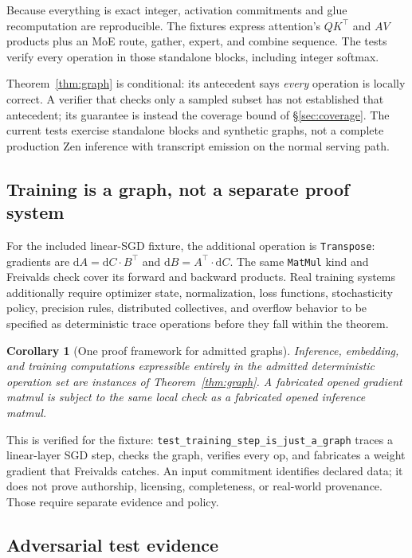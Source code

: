\documentclass[11pt,a4paper]{article}
\newtheorem{corollary}{Corollary}
\begin{document}
Because everything is exact integer, activation commitments and glue recomputation are reproducible. The fixtures express attention's $QK^{\top}$ and $AV$ products plus an MoE route, gather, expert, and combine sequence. The tests verify every operation in those standalone blocks, including integer softmax.

Theorem~\ref{thm:graph} is conditional: its antecedent says \emph{every} operation is locally correct. A verifier that checks only a sampled subset has not established that antecedent; its guarantee is instead the coverage bound of \S\ref{sec:coverage}. The current tests exercise standalone blocks and synthetic graphs, not a complete production Zen inference with transcript emission on the normal serving path.

\subsection{Training is a graph, not a separate proof system}\label{sec:training}

For the included linear-SGD fixture, the additional operation is \texttt{Transpose}: gradients are $\mathrm{d}A = \mathrm{d}C \cdot B^{\top}$ and $\mathrm{d}B = A^{\top} \cdot \mathrm{d}C$. The same \texttt{MatMul} kind and Freivalds check cover its forward and backward products. Real training systems additionally require optimizer state, normalization, loss functions, stochasticity policy, precision rules, distributed collectives, and overflow behavior to be specified as deterministic trace operations before they fall within the theorem.

\begin{corollary}[One proof framework for admitted graphs]\label{cor:one-system}
Inference, embedding, and training computations expressible entirely in the admitted deterministic operation set are instances of Theorem~\ref{thm:graph}. A fabricated opened gradient matmul is subject to the same local check as a fabricated opened inference matmul.
\end{corollary}

This is verified for the fixture: \texttt{test\_training\_step\_is\_just\_a\_graph} traces a linear-layer SGD step, checks the graph, verifies every op, and fabricates a weight gradient that Freivalds catches. An input commitment identifies declared data; it does not prove authorship, licensing, completeness, or real-world provenance. Those require separate evidence and policy.

\subsection{Adversarial test evidence}\label{sec:adversarial}
\end{document}
